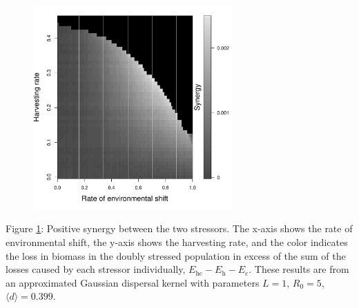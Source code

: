 \documentclass[12pt,english]{article}
\begin{document}
\begin{spacing}{1.9}
\begin{flushleft}
\begin{figure}[htbp]
\begin{center}
\includegraphics[width=3in]{plots/synergy.pdf}
\caption{
}
\label{Synergy}
\end{center}
\end{figure}

\pagebreak

Figure \ref{Synergy}: Positive synergy between the two stressors.  The x-axis shows the rate of environmental shift, the y-axis shows the harvesting rate, and the color indicates the loss in biomass in the doubly stressed population in excess of the sum of the losses caused by each stressor individually, $E_\text{hc}-E_\text{h}-E_\text{c}$.  These results are from an approximated Gaussian dispersal kernel with parameters $L=1$, $R_0=5$, $\langle d \rangle = 0.399$.

\pagebreak

\begin{figure}[htbp]


\end{figure}
\end{flushleft}
\end{spacing}
\end{document}

